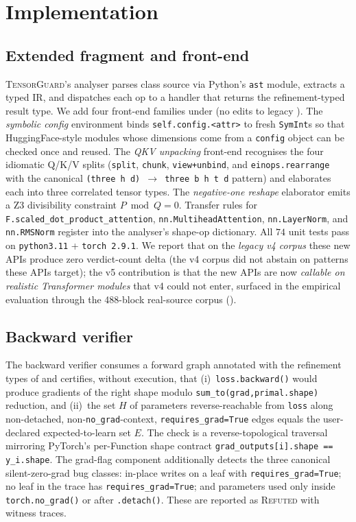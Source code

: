 \section{Implementation}\label{sec:impl}

\subsection{Extended fragment and front-end}
\label{sec:impl-fragment}
\textsc{TensorGuard}'s analyser parses class source via Python's
\texttt{ast} module, extracts a typed IR, and dispatches each
op to a handler that returns the refinement-typed result type.
We add four front-end families under (no edits
to legacy ). The \emph{symbolic config} environment
binds \texttt{self.config.<attr>} to fresh \texttt{SymInt}s so
that HuggingFace-style modules whose dimensions come from a
\texttt{config} object can be checked once and reused. The
\emph{QKV unpacking} front-end recognises the four idiomatic
Q/K/V splits (\texttt{split}, \texttt{chunk},
\texttt{view+unbind}, and \texttt{einops.rearrange} with the
canonical \texttt{(three h d) $\to$ three b h t d} pattern) and
elaborates each into three correlated tensor types. The
\emph{negative-one reshape} elaborator emits a Z3 divisibility
constraint $P\bmod Q=0$. Transfer rules for
\texttt{F.scaled\_dot\_product\_attention},
\texttt{nn.MultiheadAttention}, \texttt{nn.LayerNorm}, and
\texttt{nn.RMSNorm} register into the analyser's shape-op
dictionary. All $74$ unit tests pass on \texttt{python3.11} +
\texttt{torch~2.9.1}. We report that on the \emph{legacy
v4 corpus} these new APIs produce zero verdict-count delta (the
v4 corpus did not abstain on patterns these APIs target); the
v5 contribution is that the new APIs are now \emph{callable on
realistic Transformer modules} that v4 could not enter, surfaced
in the empirical evaluation through the 488-block real-source
corpus ().

\subsection{Backward verifier}\label{sec:impl-backward}
The backward verifier consumes a forward graph
annotated with the refinement types of  and
certifies, without execution, that (i)~\texttt{loss.backward()}
would produce gradients of the right shape modulo
\texttt{sum\_to(grad,primal.shape)} reduction, and (ii)~the set
$H$ of parameters reverse-reachable from \texttt{loss} along
non-detached, non-\texttt{no\_grad}-context,
\texttt{requires\_grad=True} edges equals the user-declared
expected-to-learn set $E$. The check is a reverse-topological
traversal mirroring PyTorch's per-Function shape contract
\verb|grad_outputs[i].shape == y_i.shape|. The grad-flag
component additionally detects the three canonical
silent-zero-grad bug classes: in-place writes on a leaf with
\texttt{requires\_grad=True}; no leaf in the trace has
\texttt{requires\_grad=True}; and parameters used only inside
\texttt{torch.no\_grad()} or after \texttt{.detach()}. These
are reported as \textsc{Refuted} with witness traces.

